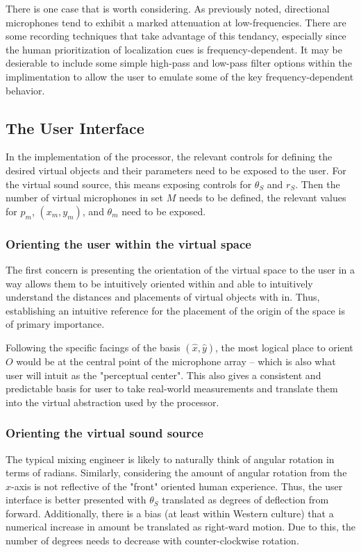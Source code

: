 There is one case that is worth considering. As previously noted, directional microphones tend to exhibit a marked attenuation at low-frequencies. There are some recording techniques that take advantage of this tendancy, especially since the human prioritization of localization cues is frequency-dependent. It may be desierable to include some simple high-pass and low-pass filter options within the implimentation to allow the user to emulate some of the key frequency-dependent behavior.

\subsection{The User Interface}

In the implementation of the processor, the relevant controls for defining the desired virtual objects and their parameters need to be exposed to the user. For the virtual sound source, this means exposing controls for $\theta_S$ and $r_S$. Then the number of virtual microphones in set $M$ needs to be defined, the relevant values for $p_m$, $(x_m,y_m)$, and $\theta_m$ need to be exposed.

\subsubsection{Orienting the user within the virtual space} The first concern is presenting the orientation of the virtual space to the user in a way allows them to be intuitively oriented within and able to intuitively understand the distances and placements of virtual objects with in. Thus, establishing an intuitive reference for the placement of the origin of the space is of primary importance.

Following the specific facings of the basis $(\hat{x},\hat{y})$, the most logical place to orient $O$ would be at the central point of the microphone array -- which is also what user will intuit as the "perceptual center". This also gives a consistent and predictable basis for user to take real-world measurements and translate them into the virtual abstraction used by the processor.

\subsubsection{Orienting the virtual sound source} The typical mixing engineer is likely to naturally think of angular rotation in terms of radians. Similarly, considering the amount of angular rotation from the $x$-axis is not reflective of the "front" oriented human experience. Thus, the user interface is better presented with $\theta_S$ translated as degrees of deflection from forward. Additionally, there is a bias (at least within Western culture) that a numerical increase in amount be translated as right-ward motion. Due to this, the number of degrees needs to decrease with counter-clockwise rotation.

